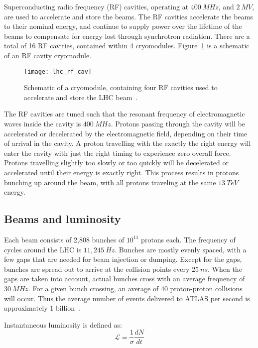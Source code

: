 Superconducting radio frequency (RF) cavities, operating at $400~MHz$, and $2~MV$, are used to accelerate and store the beams.
The RF cavities accelerate the beams to their nominal energy,
and continue to supply power over the lifetime of the beams to compensate for energy lost through synchrotron radiation.
There are a total of 16 RF cavities, contained within 4 cryomodules.
Figure~\ref{fig:rf_cryo} is a schematic of an RF cavity cryomodule.

\begin{figure}[!ht]\centering
\texttt{[image: lhc\_rf\_cav]}
\caption{Schematic of a cryomodule, containing four RF cavities used to accelerate and store the LHC beam~\cite{lhc-machine-2008}.}
\label{fig:rf_cryo}
\end{figure}

The RF cavities are tuned such that the resonant frequency of electromagnetic waves inside the cavity is $400~MHz$.
Protons passing through the cavity will be accelerated or decelerated by the electromagnetic field,
depending on their time of arrival in the cavity.
A proton travelling with the exactly the right energy will enter the cavity with just the right timing to experience zero overall force.
Protons travelling slightly too slowly or too quickly will be decelerated or accelerated until their energy is exactly right.
This process results in protons bunching up around the beam, with all protons traveling at the same $13~TeV$ energy.

\subsection{Beams and luminosity}\label{subsec:lhc_beam}

Each beam consists of 2,808 bunches of $10^{11}$ protons each.
The frequency of cycles around the LHC is $11,245~Hz$.
Bunches are mostly evenly spaced, with a few gaps that are needed for beam injection or dumping.
Except for the gaps, bunches are spread out to arrive at the collision points every $25~ns$.
When the gaps are taken into account, actual bunches cross with an average frequency of $30~MHz$.
For a given bunch crossing, an average of 40 proton-proton collisions will occur.
Thus the average number of events delivered to ATLAS per second is approximately 1 billion~\cite{lhc-guide-2017}.

Instantaneous luminosity is defined as:
\begin{equation}
\mathcal{L} = \frac{1}{\sigma}\frac{dN}{dt}
\end{equation}

